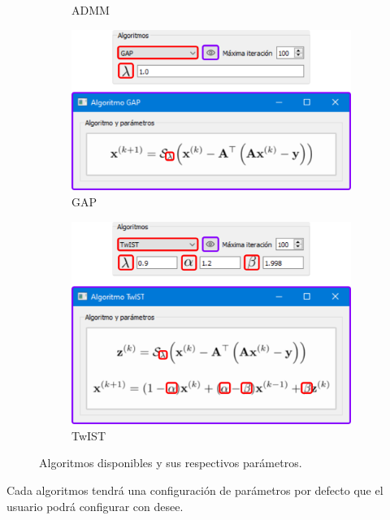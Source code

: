\documentclass[12pt,oneside,a4]{article}
\begin{document}
\begin{figure}[!ht]
\begin{subfigure}[b]{0.45\textwidth}
         \caption{ADMM}
         \label{fig:admm}
     \end{subfigure}
     \begin{subfigure}[b]{0.45\textwidth}
         \centering
         \includegraphics[width=\textwidth]{algorithm-gap.png}
         \caption{GAP}
         \label{fig:gap}
     \end{subfigure}
     \hfill
     \begin{subfigure}[b]{0.45\textwidth}
         \centering
         \includegraphics[width=\textwidth]{algorithm-twist.png}
         \caption{TwIST}
         \label{fig:twist}
     \end{subfigure}
        \caption{Algoritmos disponibles y sus respectivos parámetros.}
        \label{fig:algorithms}
\end{figure}

Cada algoritmos tendrá una configuración de parámetros por defecto que el usuario podrá configurar con desee.
\end{document}
